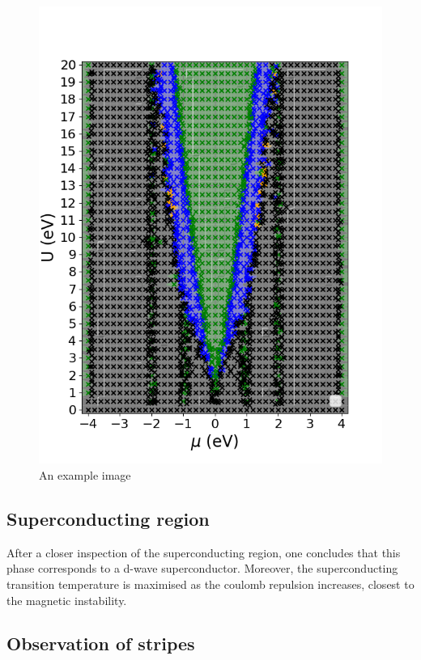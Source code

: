 \documentclass{article}
\begin{document}
\begin{figure}[h] 
    \centering
    \includegraphics[width=1.20\textwidth]{1NNpd.png} %
    \caption{An example image}
    \label{fig:Whole phase diagram}
\end{figure}

\subsection{Superconducting region}

After a closer inspection of the superconducting region, one concludes that this phase corresponds to a d-wave superconductor. 
Moreover, the superconducting transition temperature is maximised as the coulomb repulsion increases, closest to the magnetic instability. 



\subsection{Observation of stripes}
\end{document}

